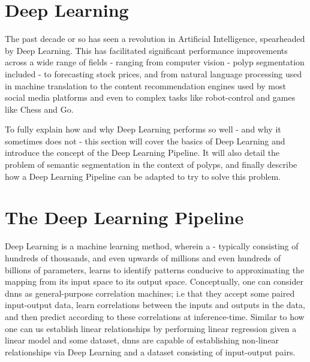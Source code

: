 \section{Deep Learning}
The past decade or so has seen a revolution in Artificial Intelligence, spearheaded by Deep Learning. This has facilitated significant performance improvements across a wide range of fields - ranging from computer vision - polyp segmentation included - to forecasting stock prices, and from natural language processing used in machine translation to the content recommendation engines used by most social media platforms and even to complex tasks like robot-control and games like Chess and Go. 


To fully explain how and why Deep Learning performs so well - and why it sometimes does not - this section will cover the basics of Deep Learning and introduce the concept of the Deep Learning Pipeline. It will also detail the problem of semantic segmentation in the context of polyps, and finally describe how a Deep Learning Pipeline can be adapted to try to solve this problem.

\section{The Deep Learning Pipeline}
    Deep Learning is a machine learning method, wherein a  - typically consisting of hundreds of thousands, and even upwards of millions and even hundreds of billions of parameters, learns to identify patterns conducive to approximating the mapping from its input space to its output space. Conceptually, one can consider \glspl{dnn} as general-purpose correlation machines; i.e that they accept some paired input-output data, learn correlations between the inputs and outputs in the data, and then predict according to these correlations at inference-time. Similar to how one can us establish linear relationships by performing linear regression given a linear model and some dataset, \glspl{dnn} are capable of establishing non-linear relationships via Deep Learning and a dataset consisting of input-output pairs. 
    
